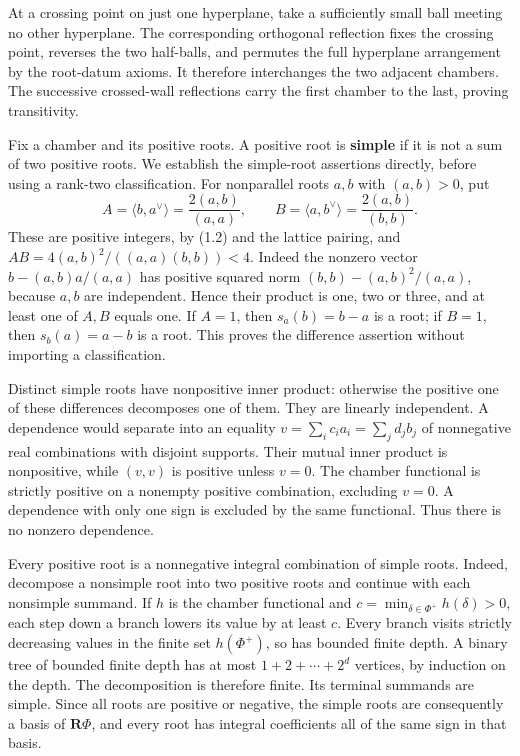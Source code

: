 \documentclass[11pt,a4paper,openany]{report}
\newcounter{none}
\begin{document}
At a crossing point on just one hyperplane, take a sufficiently small ball meeting no other hyperplane. The corresponding orthogonal reflection fixes the crossing point, reverses the two half-balls, and permutes the full hyperplane arrangement by the root-datum axioms. It therefore interchanges the two adjacent chambers. The successive crossed-wall reflections carry the first chamber to the last, proving transitivity.

Fix a chamber and its positive roots. A positive root is \textbf{simple} if it is not a sum of two positive roots. We establish the simple-root assertions directly, before using a rank-two classification. For nonparallel roots \(a,b\) with \((a,b)>0\), put \[
 A=\langle b,a^\vee\rangle=\frac{2(a,b)}{(a,a)},
 \qquad B=\langle a,b^\vee\rangle=\frac{2(a,b)}{(b,b)}.
\] These are positive integers, by (1.2) and the lattice pairing, and \(AB=4(a,b)^2/((a,a)(b,b))<4\). Indeed the nonzero vector \(b-(a,b)a/(a,a)\) has positive squared norm \((b,b)-(a,b)^2/(a,a)\), because \(a,b\) are independent. Hence their product is one, two or three, and at least one of \(A,B\) equals one. If \(A=1\), then \(s_a(b)=b-a\) is a root; if \(B=1\), then \(s_b(a)=a-b\) is a root. This proves the difference assertion without importing a classification.

Distinct simple roots have nonpositive inner product: otherwise the positive one of these differences decomposes one of them. They are linearly independent. A dependence would separate into an equality \(v=\sum_i c_i a_i=\sum_j d_j b_j\) of nonnegative real combinations with disjoint supports. Their mutual inner product is nonpositive, while \((v,v)\) is positive unless \(v=0\). The chamber functional is strictly positive on a nonempty positive combination, excluding \(v=0\). A dependence with only one sign is excluded by the same functional. Thus there is no nonzero dependence.

Every positive root is a nonnegative integral combination of simple roots. Indeed, decompose a nonsimple root into two positive roots and continue with each nonsimple summand. If \(h\) is the chamber functional and \(c=\min_{\delta\in\Phi^+}h(\delta)>0\), each step down a branch lowers its value by at least \(c\). Every branch visits strictly decreasing values in the finite set \(h(\Phi^+)\), so has bounded finite depth. A binary tree of bounded finite depth has at most \(1+2+\cdots+2^d\) vertices, by induction on the depth. The decomposition is therefore finite. Its terminal summands are simple. Since all roots are positive or negative, the simple roots are consequently a basis of \(\mathbf R\Phi\), and every root has integral coefficients all of the same sign in that basis.
\end{document}
